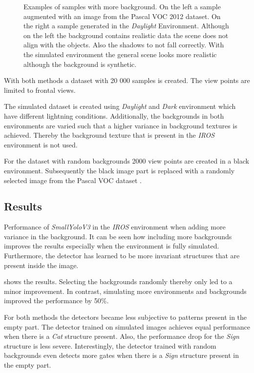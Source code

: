 \begin{figure}[hbtp]
\begin{minipage}{0.3\textwidth}
	\end{minipage}
	\caption{Examples of samples with more background. On the left a sample augmented with an image from the Pascal VOC 2012 dataset. On the right a sample generated in the \textit{Daylight} Environment. Although on the left the background contains realistic data the scene does not align with the objects. Also the shadows to not fall correctly. With the simulated environment the general scene looks more realistic although the background is synthetic.}
	\label{fig:sim_vs_voc}
\end{figure}

With both methods a dataset with 20 000 samples is created. The view points are limited to frontal views.

The simulated dataset is created using \textit{Daylight} and \textit{Dark} environment which have different lightning conditions. Additionally, the backgrounds in both environments are varied such that a higher variance in background textures is achieved. Thereby the background texture that is present in the \textit{IROS} environment is not used.

For the dataset with random backgrounds 2000 view points are created in a black environment. Subsequently the black image part is replaced with a randomly selected image from the Pascal VOC dataset .

\subsection{Results}

\begin{table}
	\centering
	
	\caption{Performance of \textit{SmallYoloV3} in the \textit{IROS} environment when adding more variance in the background. It can be seen how including more backgrounds improves the results especially when the environment is fully simulated. Furthermore, the detector has learned to be more invariant structures that are present inside the image.}
	\label{tab:sim_vs_voc}
\end{table}

 shows the results. Selecting the backgrounds randomly thereby only led to a minor improvement. In contrast, simulating more environments and backgrounds improved the performance by 50\%.

For both methods the detectors became less subjective to patterns present in the empty part. The detector trained on simulated images achieves equal performance when there is a \textit{Cat} structure present. Also, the performance drop for the \textit{Sign} structure is less severe. Interestingly, the detector trained with random backgrounds even detects more gates when there is a \textit{Sign} structure present in the empty part.

